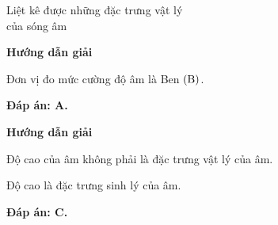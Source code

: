 \begin{dang}{Liệt kê được những đặc trưng vật lý\\ của sóng âm}
	{\begin{center}
			\textbf{Hướng dẫn giải}
		\end{center}
		Đơn vị đo mức cường độ âm là Ben $(\text B)$.
		
		\textbf{Đáp án: A.}
		
	}
	{\begin{center}
			\textbf{Hướng dẫn giải}
		\end{center}
		Độ cao của âm không phải là đặc trưng vật lý của âm.
		
		Độ cao là đặc trưng sinh lý của âm.
		
		\textbf{Đáp án: C.}
	}
\end{dang}
